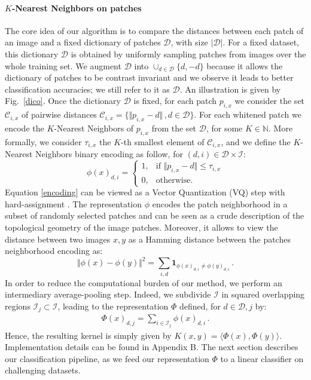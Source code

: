 \documentclass{article} %
\begin{document}
\paragraph{$K$-Nearest Neighbors on patches}
The core idea of our algorithm is to compare the distances between each patch of an image and a fixed dictionary of patches $\mathcal{D}$, with size $|\mathcal{D}|$.
For a fixed dataset, this dictionary $\mathcal{D}$ is obtained by uniformly sampling patches from images over the whole training set. We augment $\mathcal{D}$ into $\cup_{d\in \mathcal{D}}\{d,-d\}$ because it allows the dictionary of patches to be contrast invariant and we observe it leads to better classification accuracies; we still refer to it as $\mathcal{D}$. An illustration is given by Fig.~\ref{dico}. Once the dictionary $\mathcal{D}$ is fixed, for each patch $p_{i,x}$ we consider the set $\mathcal{C}_{i, x}$ of pairwise distances $\mathcal{C}_{i, x} =\{\Vert p_{i, x} - d \Vert\,, d\in\mathcal{D} \} $.
For each whitened patch we encode the $K$-Nearest Neighbors of $p_{i,x}$ from the set $\mathcal{D}$, for some $ K \in \mathbb{N}$.
More formally, we consider $\tau_{i,x}$ the $K$-th smallest  element of $\mathcal{C}_{i,x}$, and we define the $K$-Nearest Neighbors binary encoding as follow, for $(d,i)\in\mathcal{D}\times\mathcal{I}$:
\begin{equation}
\label{encoding}
\phi(x)_{d,i}=
\begin{cases}
1,&\text{if } \Vert  p_{i,x} - d\Vert \leq \tau_{i,x}\\
0,&\text{otherwise}.
\end{cases} 
\end{equation}
Equation \ref{encoding} can be viewed as a Vector Quantization (VQ) step with hard-assignment \citep{coates2011importance}.
The representation $\phi$ encodes the patch neighborhood in a subset of randomly selected patches and can be seen as a crude description of the topological geometry of the image patches.
Moreover, it allows to view the distance between two images $x,y$ as a Hamming distance between the patches neighborhood encoding as:
\[\Vert \phi(x)-\phi(y)\Vert^2 = \sum_{i,d}\mathbf{1}_{\phi(x)_{d,i} \neq \phi(y)_{d,i}}\,.\]
In order to reduce the computational burden of our method, we perform an intermediary average-pooling step.
Indeed, we subdivide $\mathcal{I}$ in squared overlapping regions $\mathcal{I}_j\subset\mathcal{I}$, leading to the representation $\Phi$ defined, for $d\in\mathcal{D}, j$ by:
\begin{align}\Phi(x)_{d,j}= \sum_{i\in \mathcal{I}_j}\phi(x)_{d,i}\,.\end{align}
Hence, the resulting kernel is simply given by $K(x,y)= \langle \Phi(x),\Phi(y)\rangle $. Implementation details can be found in Appendix B. The next section describes our classification pipeline, as we feed our representation $\Phi$ to a linear classifier on challenging datasets.
\end{document}
